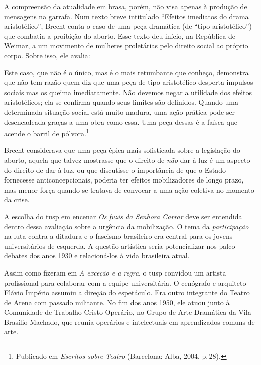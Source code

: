 A compreensão da atualidade em brasa, porém, não visa apenas à produção
de mensagens na garrafa. Num texto breve intitulado “Efeitos imediatos
do drama aristotélico”, Brecht conta o caso de uma peça dramática (de
“tipo aristotélico”) que combatia a proibição do aborto. Esse texto deu
início, na República de Weimar, a um movimento de mulheres proletárias
pelo direito social ao próprio corpo. Sobre isso, ele avalia:

\startblockquote
Este caso, que não é o único, mas é o mais retumbante que conheço,
demonstra que não tem razão quem diz que uma peça de tipo aristotélico
desperta impulsos sociais mas os queima imediatamente. Não devemos negar
a utilidade dos efeitos aristotélicos; ela se confirma quando seus
limites são definidos. Quando uma determinada situação social está muito
madura, uma ação prática pode ser desencadeada graças a uma obra como
essa. Uma peça dessas é a faísca que acende o barril de
pólvora.\footnote{Publicado em {\it Escritos sobre Teatro} (Barcelona:
  Alba, 2004, p.\,28).}
\stopblockquote

Brecht considerava que uma peça épica mais sofisticada sobre a
legislação do aborto, aquela que talvez mostrasse que o direito de
{\it não} dar à luz é um aspecto do direito de dar à luz, ou que
discutisse o importância de que o Estado fornecesse anticoncepcionais,
poderia ter efeitos mobilizadores de longo prazo, mas menor força quando
se tratava de convocar a uma ação coletiva no momento da crise.

A escolha do {\sc tusp} em encenar {\it Os fuzis da Senhora Carrar} deve ser
entendida dentro dessa avaliação sobre a urgência da mobilização. O tema
da {\it participação} na luta contra a ditadura e o fascismo brasileiro
era central para os jovens universitários de esquerda. A questão
artística seria potencializar nos palco debates dos anos 1930 e
relacioná-los à vida brasileira atual.

\subject{Formação da equipe}

Assim como fizeram em {\it A exceção e a regra}, o {\sc tusp} convidou um
artista profissional para colaborar com a equipe universitária. O
cenógrafo e arquiteto Flávio Império assumiu a direção do espetáculo.
Era outro integrante do Teatro de Arena com passado militante. No fim
dos anos 1950, ele atuou junto à Comunidade de Trabalho Cristo Operário,
no Grupo de Arte Dramática da Vila Brasílio Machado, que reunia
operários e intelectuais em aprendizados comuns de arte.

